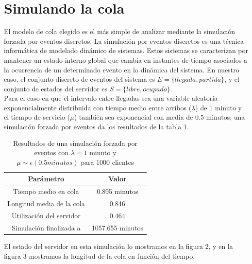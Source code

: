 \documentclass[10pt,journal,compsoc]{IEEEtran}
\begin{document}
\section{Simulando la cola} %
El modelo de cola elegido es el m\'as simple de analizar mediante la simulaci\'on forzada por eventos discretos.
La simulaci\'on por eventos discretos es una t\'ecnica inform\'atica de modelado din\'amico de
sistemas. Estos sistemas se caracterizan por mantener un estado interno global que cambia en instantes
de tiempo asociados a la ocurrencia de un determinado evento en la din\'amica del sistema. En nuestro
caso, el conjunto discreto de eventos del sistema es $E=\{llegada, partida\}$, y el conjunto de estados
del servidor es $S=\{libre, ocupado\}$.\\
Para el caso en que el intervalo entre llegadas sea una variable aleatoria exponencialmente distribuida
con tiempo medio entre arribos ($\lambda$) de 1 minuto y el tiempo de servicio ($\mu$) tambi\'en sea 
exponencial con media de 0.5 minutos; una simulaci\'on forzada por eventos da los resultados de la tabla 1.\\

\begin{table}[!t]
\renewcommand{\arraystretch}{1.3}
\centering
\begin{tabular}{c c}
\hline
\hline
Par\'ametro  				&	Valor			\\
\hline
Tiempo medio en cola		&	0.895 minutos	\\
Longitud media de la cola	&	0.846			\\
Utilizaci\'on del servidor	&	0.464			\\
Simulaci\'on finalizada a	&	1057.655 minutos\\
\hline
\hline
\end{tabular}
\label{tab:sim}
\caption{Resultados de una simulaci\'on forzada por eventos con $\lambda = 1$ minuto y $\mu \sim \epsilon(0.5 minutos)$ para 1000 clientes}
\end{table}

El estado del servidor en esta simulaci\'on lo mostramos en la figura 2, y en la figura 3 mostramos
la longitud de la cola en funci\'on del tiempo.
\end{document}
